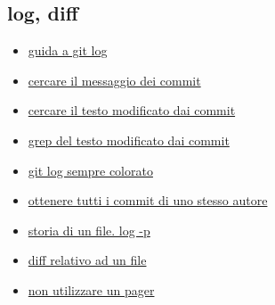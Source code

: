 \documentclass{article} \usepackage[textwidth=19cm,textheight=24cm]{geometry}
\begin{document}
\subsection{log, diff}
\begin{itemize}
    \item \href{https://www.toolsqa.com/git/git-log/}{guida a git log}
    \item \href{https://stackoverflow.com/questions/7124914/how-to-search-a-git-repository-by-commit-message}
        {cercare il messaggio dei commit}
    \item \href{https://stackoverflow.com/questions/5816134/how-to-find-the-git-commit-that-introduced-a-string-in-any-branch}
        {cercare il testo modificato dai commit}
    \item \href{https://stackoverflow.com/questions/2928584/how-to-grep-search-committed-code-in-the-git-history}
        {grep del testo modificato dai commit}
    \item \href{https://unix.stackexchange.com/questions/19317/can-less-retain-colored-output}
        {git log sempre colorato}
    \item \href{https://stackoverflow.com/questions/4259996/how-can-i-view-a-git-log-of-just-one-users-commits}
        {ottenere tutti i commit di uno stesso autore}
    \item \href{https://stackoverflow.com/questions/278192/view-the-change-history-of-a-file-using-git-versioning}
        {storia di un file. log -p}
    \item \href{https://stackoverflow.com/questions/4456532/how-can-i-see-what-has-changed-in-a-file-before-committing-to-git}
        {diff relativo ad un file}
    \item \href{https://stackoverflow.com/questions/2183900/how-do-i-prevent-git-diff-from-using-a-pager}
        {non utilizzare un pager}
\end{itemize}
\end{document}
